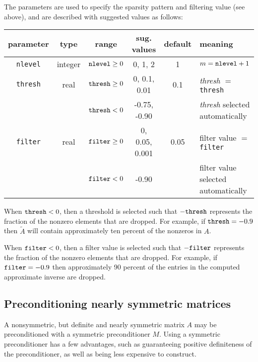 The parameters are used to specify the sparsity pattern and filtering value
(see above), and are described with suggested values as follows:

\begin{center}
\begin{tabular}{|c|c|c|c|c|l|} \hline
parameter    & type    & range                & sug. values  & default & meaning \\ \hline
{\tt nlevel} & integer & ${\tt nlevel} \ge 0$ & 0, 1, 2      & 1   & $m={\tt nlevel}+1$\\
\hline
{\tt thresh} & real    & ${\tt thresh} \ge 0$ & 0, 0.1, 0.01 & 0.1 & {\em thresh} $=$ {\tt thresh}\\
             &         & ${\tt thresh}  <  0$ & -0.75, -0.90 &     & {\em thresh} selected automatically\\
\hline
{\tt filter} & real    & ${\tt filter} \ge 0$ & 0, 0.05, 0.001 & 0.05 & filter value $=$ {\tt filter}\\
             &         & ${\tt filter}  <  0$ & -0.90        &     & filter value selected automatically\\
\hline
\end{tabular}
\end{center}

When ${\tt thresh} < 0$, then a threshold is selected such that 
$-{\tt thresh}$ represents the fraction of the nonzero elements
that are dropped.  For example, if ${\tt thresh} = -0.9$ then
$\tilde{A}$ will contain approximately ten percent of the nonzeros
in $A$.

When ${\tt filter} < 0$, then a filter value is selected such that 
$-{\tt filter}$ represents the fraction of the nonzero elements
that are dropped.  For example, if ${\tt filter} = -0.9$ then
approximately 90 percent of the entries in the computed approximate 
inverse are dropped.


\subsection{Preconditioning nearly symmetric matrices}
\label{nearly}

A nonsymmetric, but definite and nearly symmetric matrix $A$ 
may be preconditioned
with a symmetric preconditioner $M$.  Using a symmetric preconditioner
has a few advantages, such as guaranteeing positive
definiteness of the preconditioner, as well as being less expensive
to construct.

